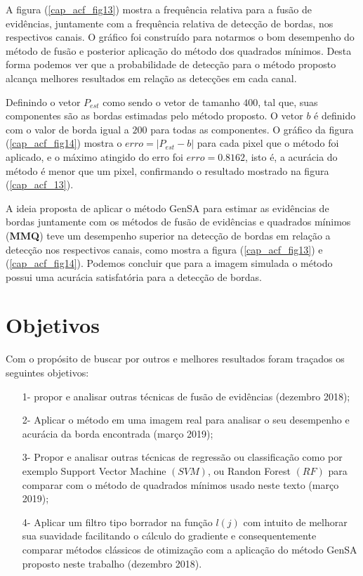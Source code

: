 A figura (\ref{cap_acf_fig13}) mostra a frequência relativa para a fusão de evidências, juntamente com a frequência relativa de detecção de bordas, nos respectivos canais. O gráfico foi construído para notarmos o bom desempenho do método de fusão e posterior aplicação do método dos quadrados mínimos. Desta forma podemos ver que a probabilidade de detecção para o método proposto alcança melhores resultados em relação as detecções em cada canal. 

 Definindo o vetor $P_{est}$ como sendo o vetor de tamanho $400$, tal que, suas componentes são as bordas estimadas pelo método proposto. O vetor $b$ é definido com o valor de borda igual a $200$ para todas as componentes. O gráfico da figura (\ref{cap_acf_fig14}) mostra o $erro=|P_{est}-b|$ para cada pixel que o método foi aplicado, e o máximo atingido do erro foi $erro=0.8162$, isto é, a acurácia do método é menor que um pixel, confirmando o resultado mostrado na figura (\ref{cap_acf_13}).

A ideia proposta de aplicar o método GenSA para estimar as evidências de bordas juntamente com os métodos de fusão de evidências e quadrados  mínimos (\textbf{MMQ}) teve um desempenho superior na detecção de bordas em relação a detecção nos respectivos canais, como mostra a figura (\ref{cap_acf_fig13}) e (\ref{cap_acf_fig14}). Podemos concluir que para a imagem simulada o método possui uma acurácia satisfatória para a detecção de bordas.
\chapter{Objetivos}
Com o propósito de buscar por outros e melhores resultados foram traçados os seguintes objetivos: 
\begin{itemize}
    \item[1-] propor e analisar outras técnicas de fusão de evidências (dezembro   2018); 
	\item[2-] Aplicar o método em uma imagem real para analisar o seu desempenho e acurácia da borda encontrada (março 2019);
	\item[3-] Propor e analisar outras técnicas de regressão ou classificação como por exemplo Support Vector Machine $(SVM)$, ou Randon Forest $(RF)$ para  comparar com o método de quadrados mínimos usado neste texto (março 2019);
	\item[4-] Aplicar um filtro tipo borrador na função $l(j)$ com intuito de melhorar sua suavidade facilitando o cálculo do gradiente e consequentemente comparar métodos clássicos de otimização com a aplicação do método GenSA proposto neste trabalho (dezembro 2018). 
\end{itemize}

